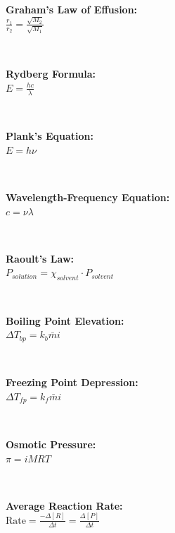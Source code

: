 \\ \begin{minipage}{\textwidth}
    \textbf{Graham’s Law of Effusion:}
    \\ \( \displaystyle\frac{ r_1 }{ r_2 } = \displaystyle\frac{ \sqrt{ M_2 } }{ \sqrt{ M_1 } } \)
\end{minipage}
\\ \begin{minipage}{\textwidth}
    \textbf{Rydberg Formula:}
    \\ \( E = \displaystyle\frac{ hc }{ \lambda } \)
\end{minipage}
\\ \begin{minipage}{\textwidth}
    \textbf{Plank’s Equation:}
    \\ \( E = h \nu \)
\end{minipage}
\\ \begin{minipage}{\textwidth}
    \textbf{Wavelength-Frequency Equation:}
    \\ \( c = \nu \lambda \)
\end{minipage}
\\ \begin{minipage}{\textwidth}
    \textbf{Raoult’s Law:}
    \\ \( P_{solution} = \chi_{solvent} \cdot P_{solvent} \)
\end{minipage}
\\ \begin{minipage}{\textwidth}
    \textbf{Boiling Point Elevation:}
    \\ \( \Delta T_{bp} = k_b \bar{m} i \)
\end{minipage}
\\ \begin{minipage}{\textwidth}
    \textbf{Freezing Point Depression:}
    \\ \( \Delta T_{fp} = k_f \bar{m} i \)
\end{minipage}
\\ \begin{minipage}{\textwidth}
    \textbf{Osmotic Pressure:}
    \\ \( \pi = iMRT \)
\end{minipage}
\\ \begin{minipage}{\textwidth}
    \textbf{Average Reaction Rate:}
    \\ \( \text{Rate} = \displaystyle\frac{ - \Delta [ R ] }{ \Delta t } = \displaystyle\frac{ \Delta [ P ] }{ \Delta t } \)
\end{minipage}
